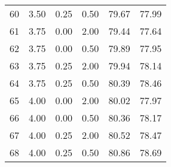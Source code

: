 \begin{tabular}{rrrrrr}
  60 & 3.50 & 0.25 & 0.50 & 79.67 & 77.99 \\ 
  61 & 3.75 & 0.00 & 2.00 & 79.44 & 77.64 \\ 
  62 & 3.75 & 0.00 & 0.50 & 79.89 & 77.95 \\ 
  63 & 3.75 & 0.25 & 2.00 & 79.94 & 78.14 \\ 
  64 & 3.75 & 0.25 & 0.50 & 80.39 & 78.46 \\ 
  65 & 4.00 & 0.00 & 2.00 & 80.02 & 77.97 \\ 
  66 & 4.00 & 0.00 & 0.50 & 80.36 & 78.17 \\ 
  67 & 4.00 & 0.25 & 2.00 & 80.52 & 78.47 \\ 
  68 & 4.00 & 0.25 & 0.50 & 80.86 & 78.69 \\ 
   \hline
\end{tabular}

